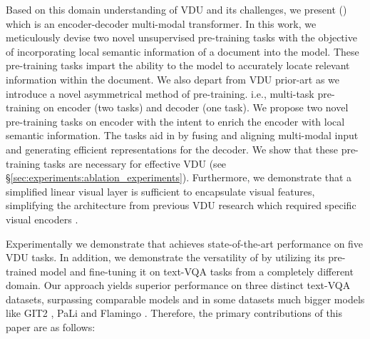 \documentclass[10pt,twocolumn,letterpaper]{article}
\begin{document}
Based on this domain understanding of VDU and its challenges, we present \papertitle (\papertitleshortnospace) which is an encoder-decoder multi-modal transformer. 
In this work, we meticulously devise two novel unsupervised pre-training tasks with the objective of incorporating local semantic information of a document into the model. These pre-training tasks impart the ability to the model to accurately locate relevant information within the document. We also depart from VDU prior-art\cite{powalski2021going,Tang2022UnifyingUDOP} as we introduce a novel asymmetrical method of pre-training. i.e., multi-task pre-training on encoder (two tasks) and decoder (one task).
We propose two novel pre-training tasks on encoder with the intent to enrich the encoder with local semantic information. The tasks aid in by fusing and aligning multi-modal input and generating efficient representations for the decoder. 
We show that these pre-training tasks are necessary for effective VDU (see \S \ref{sec:experiments:ablation_experiments}). 
Furthermore, we demonstrate that a simplified linear visual layer is sufficient to encapsulate visual features, simplifying the architecture from previous VDU research \cite{xu2020layoutlmv2, Li2021SelfDoc, powalski2021going} which required specific visual encoders \cite{dosovitskiy2020image,Liu2021Swin, he_cvpr2016_resnet}.



Experimentally we demonstrate that \papertitle achieves state-of-the-art performance on  five VDU tasks. In addition, we demonstrate the versatility of \papertitle by utilizing its pre-trained model and fine-tuning it on text-VQA tasks from a completely different domain. Our approach yields superior performance on three distinct text-VQA datasets, surpassing comparable models and in some datasets much bigger models like GIT2 \cite{wang2022git}, PaLi \cite{Chen2022PaLI} and Flamingo \cite{Alayrac2022FlamingoAV}. 
Therefore, the primary contributions of this paper are as follows:
\end{document}
